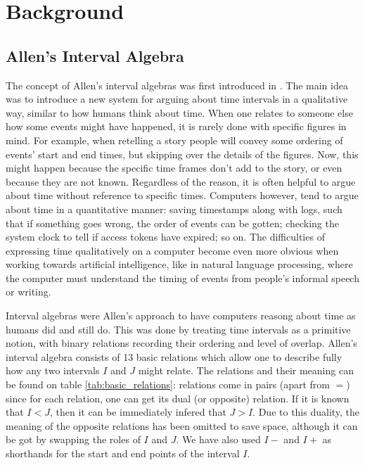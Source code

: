 \section{Background}%
\label{sec:background}

\subsection{Allen's Interval Algebra}%
\label{sub:allen_interval_algebras}

The concept of Allen's interval algebras was first introduced in \cite{allen83}. The main
idea was to introduce a new system for arguing about time intervals in a qualitative way, similar
to how humans think about time. When one relates to someone else how some events might have
happened, it is rarely done with specific figures in mind. For example, when retelling a story
people will convey some ordering of events' start and end times, but skipping over the details
of the figures. Now, this might happen because the specific time frames don't add to the
story, or even because they are not known. Regardless of the reason, it is often helpful to argue
about time without reference to specific times. Computers however, tend to argue about time in a
quantitative manner: saving timestamps along with logs, such that if something goes wrong, the
order of events can be gotten; checking the system clock to tell if access tokens have expired;
so on. The difficulties of expressing time qualitatively on a computer become even more obvious
when working towards artificial intelligence, like in natural language processing, where the
computer must understand the timing of events from people's informal speech or writing.

Interval algebras were Allen's approach to have computers reasong about time as humans did and
still do. This was done by treating time intervals as a primitive notion, with binary relations
recording their ordering and level of overlap. Allen's interval algebra consists of 13 basic
relations which allow one to describe fully how any two intervals $I$ and $J$ might relate. The
relations and their meaning can be found on table \ref{tab:basic_relations}: relations come in
pairs (apart from $=$) since for each relation, one can get its dual (or opposite) relation.
If it is known that \(I < J\), then it can be immediately infered that \(J > I\). Due to this
duality, the meaning of the opposite relations has been omitted to save space, although it can be
got by swapping the roles of $I$ and $J$. We have also used $I-$ and $I+$ as shorthands for the
start and end points of the interval $I$.

